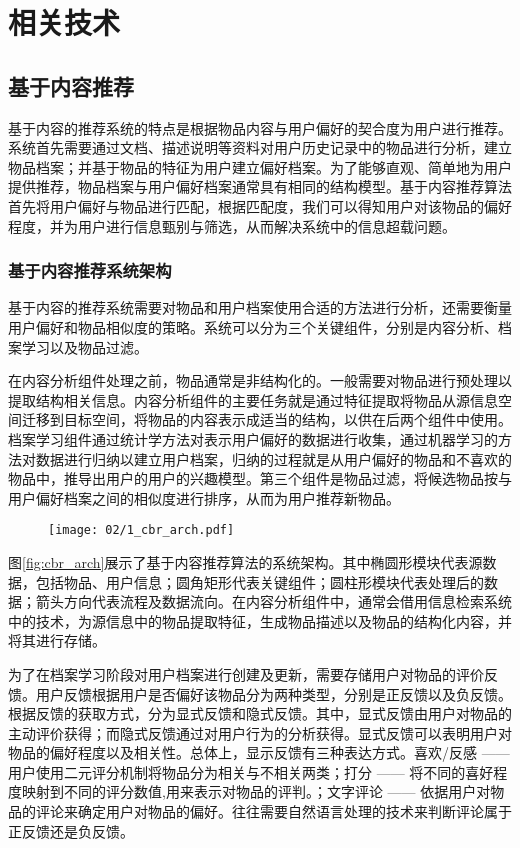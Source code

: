 \chapter{相关技术}
\label{chap:related}

\section{基于内容推荐}

基于内容的推荐系统的特点是根据物品内容与用户偏好的契合度为用户进行推荐\cite{lops2011content}。系统首先需要通过文档、描述说明等资料对用户历史记录中的物品进行分析，建立物品档案；并基于物品的特征为用户建立偏好档案。为了能够直观、简单地为用户提供推荐，物品档案与用户偏好档案通常具有相同的结构模型。基于内容推荐算法首先将用户偏好与物品进行匹配，根据匹配度，我们可以得知用户对该物品的偏好程度，并为用户进行信息甄别与筛选，从而解决系统中的信息超载问题。

\subsection{基于内容推荐系统架构}
基于内容的推荐系统需要对物品和用户档案使用合适的方法进行分析，还需要衡量用户偏好和物品相似度的策略。系统可以分为三个关键组件，分别是内容分析、档案学习以及物品过滤。

在内容分析组件处理之前，物品通常是非结构化的。一般需要对物品进行预处理以提取结构相关信息。内容分析组件的主要任务就是通过特征提取将物品从源信息空间迁移到目标空间，将物品的内容表示成适当的结构，以供在后两个组件中使用。档案学习组件通过统计学方法对表示用户偏好的数据进行收集，通过机器学习的方法对数据进行归纳以建立用户档案，归纳的过程就是从用户偏好的物品和不喜欢的物品中，推导出用户的用户的兴趣模型。第三个组件是物品过滤，将候选物品按与用户偏好档案之间的相似度进行排序，从而为用户推荐新物品\cite{herlocker2004evaluating}。

\begin{figure}
 \centering
 \texttt{[image: 02/1\_cbr\_arch.pdf]}
\end{figure}

图\ref{fig:cbr_arch}展示了基于内容推荐算法的系统架构。其中椭圆形模块代表源数据，包括物品、用户信息；圆角矩形代表关键组件；圆柱形模块代表处理后的数据；箭头方向代表流程及数据流向。在内容分析组件中，通常会借用信息检索系统中的技术，为源信息中的物品提取特征，生成物品描述以及物品的结构化内容，并将其进行存储。

为了在档案学习阶段对用户档案进行创建及更新，需要存储用户对物品的评价反馈\cite{goldberg1992using}。用户反馈根据用户是否偏好该物品分为两种类型，分别是正反馈以及负反馈\cite{holte1996inferring}。根据反馈的获取方式，分为显式反馈和隐式反馈。其中，显式反馈由用户对物品的主动评价获得；而隐式反馈通过对用户行为的分析获得。显式反馈可以表明用户对物品的偏好程度以及相关性。总体上，显示反馈有三种表达方式。喜欢/反感 —— 用户使用二元评分机制将物品分为相关与不相关两类\cite{billsus1999hybrid}；打分 —— 将不同的喜好程度映射到不同的评分数值,用来表示对物品的评判\cite{pazzani1996syskill}。；文字评论 —— 依据用户对物品的评论来确定用户对物品的偏好\cite{resnick1994grouplens}。往往需要自然语言处理的技术来判断评论属于正反馈还是负反馈。


